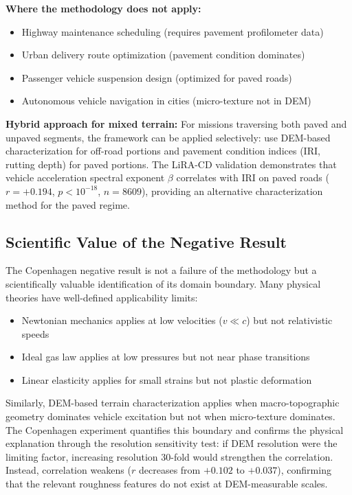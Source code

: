 \documentclass[11pt]{article}
\begin{document}
\textbf{Where the methodology does not apply:}
\begin{itemize}
\item Highway maintenance scheduling (requires pavement profilometer data)
\item Urban delivery route optimization (pavement condition dominates)
\item Passenger vehicle suspension design (optimized for paved roads)
\item Autonomous vehicle navigation in cities (micro-texture not in DEM)
\end{itemize}

\textbf{Hybrid approach for mixed terrain:} For missions traversing both paved and unpaved segments, the framework can be applied selectively: use DEM-based characterization for off-road portions and pavement condition indices (IRI, rutting depth) for paved portions. The LiRA-CD validation demonstrates that vehicle acceleration spectral exponent $\beta$ correlates with IRI on paved roads ($r = +0.194$, $p < 10^{-18}$, $n=8609$), providing an alternative characterization method for the paved regime.

\subsection{Scientific Value of the Negative Result}

The Copenhagen negative result is not a failure of the methodology but a scientifically valuable identification of its domain boundary. Many physical theories have well-defined applicability limits:
\begin{itemize}
\item Newtonian mechanics applies at low velocities ($v \ll c$) but not relativistic speeds
\item Ideal gas law applies at low pressures but not near phase transitions
\item Linear elasticity applies for small strains but not plastic deformation
\end{itemize}

Similarly, DEM-based terrain characterization applies when macro-topographic geometry dominates vehicle excitation but not when micro-texture dominates. The Copenhagen experiment quantifies this boundary and confirms the physical explanation through the resolution sensitivity test: if DEM resolution were the limiting factor, increasing resolution 30-fold would strengthen the correlation. Instead, correlation weakens ($r$ decreases from $+0.102$ to $+0.037$), confirming that the relevant roughness features do not exist at DEM-measurable scales.
\end{document}
